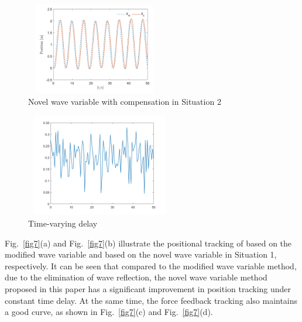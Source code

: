 
\begin{figure}[htbp]
    \centerline{\includegraphics[height=4cm,width=6cm]{with_compensation.jpg}}
    \caption{Novel wave variable with compensation in Situation 2}
    \label{fig9}
\end{figure}

\begin{figure}[htbp]
    \centerline{\includegraphics[height=4.5cm,width=6.5cm]{varying_time.jpg}}
    \caption{Time-varying delay}
    \label{fig10}
\end{figure}

\par  Fig.~\ref{fig7}(a) and Fig.~\ref{fig7}(b)  illustrate the positional tracking of based on
the modified wave variable and based on the novel wave variable in Situation 1, respectively.
It can be seen that compared to the modified wave variable method, due to the elimination of wave reflection,
the novel wave variable method proposed in this paper
has a significant improvement in position tracking under constant time delay.
At the same time,
the force feedback tracking also maintains a good curve,
as shown in Fig.~\ref{fig7}(c) and Fig.~\ref{fig7}(d).

